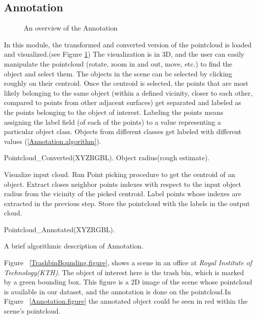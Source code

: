  
 
\subsection{Annotation}
\label{Annotation.ssec}

\begin{figure}[t]
  \caption[Annotation overview]
  {An overview of the Annotation}
  \label{AnnotationFlowchart.figure}
\end{figure}


In this module, the transformed and converted version of the pointcloud is loaded and visualized.(see Figure \ref{AnnotationFlowchart.figure}) The visualization is in 3D, and the user can easily manipulate the pointcloud (rotate, zoom in and out, move, etc.) to find the object and select them. 
The objects in the scene can be selected by clicking roughly on their centroid. Once the centroid is selected, the points that are most likely belonging to the same object (within a defined vicinity, closer to each other, compared to points from other adjacent surfaces) get separated and labeled as the points belonging to the object of interest. Labeling the points means assigning the label field (of each of the points) to a value representing a particular object class. 
Objects from different classes get labeled with different values (\ref{Annotation.algorithm}).

\begin{algorithm}[t]
\begin{algorithmic}[1]
\REQUIRE Pointcloud\_Converted(XYZRGBL).
\REQUIRE Object radius(rough estimate).
\medskip

\STATE Visualize input cloud.
  \STATE Run Point picking procedure to get the centroid of an object.
  \STATE Extract closes neighbor points indexes with respect to the input object radius from the vicinity of the picked centroid.
  \STATE Label points whose indexes are extracted in the previous step.
\ENDFOR
\STATE Store the pointcloud with the labels in the output cloud.

\medskip
\ENSURE Pointcloud\_Annotated(XYZRGBL).
\end{algorithmic}
\caption[Annotation.]
{A brief algorithmic description of Annotation.}
\label{Annotation.algorithm}
\end{algorithm}


Figure ~\ref{TrashbinBounding.figure}, shows a scene in an office at {\it Royal Institute of Technology(KTH)}. The object of interest here is the trash bin, which is marked by a green bounding box. This figure is a 2D image of the scene whose pointcloud is available in our dataset, and the annotation is done on the pointcloud.In Figure ~\ref{Annotation.figure} the annotated object could be seen in red within the scene's pointcloud.


